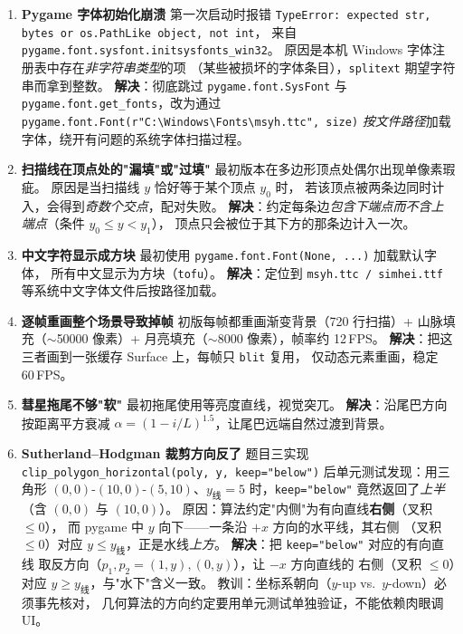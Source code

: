 \documentclass[12pt, a4paper]{article}
\begin{document}
\begin{enumerate}[label=（\arabic*）, leftmargin=*]
    \item \textbf{Pygame 字体初始化崩溃}\quad
    第一次启动时报错
    \texttt{TypeError: expected str, bytes or os.PathLike object, not int}，
    来自 \texttt{pygame.font.sysfont.initsysfonts\_win32}。
    原因是本机 Windows 字体注册表中存在\textit{非字符串类型}的项
    （某些被损坏的字体条目），\texttt{splitext} 期望字符串而拿到整数。
    \textbf{解决}：彻底跳过 \texttt{pygame.font.SysFont} 与
    \texttt{pygame.font.get\_fonts}，改为通过
    \texttt{pygame.font.Font(r"C:\textbackslash{}Windows\textbackslash{}Fonts\textbackslash{}msyh.ttc", size)}
    \textit{按文件路径}加载字体，绕开有问题的系统字体扫描过程。

    \item \textbf{扫描线在顶点处的"漏填"或"过填"}\quad
    最初版本在多边形顶点处偶尔出现单像素瑕疵。
    原因是当扫描线 $y$ 恰好等于某个顶点 $y_0$ 时，
    若该顶点被两条边同时计入，会得到\textit{奇数个交点}，配对失败。
    \textbf{解决}：约定每条边\textit{包含下端点而不含上端点}（条件 $y_0 \le y < y_1$），
    顶点只会被位于其下方的那条边计入一次。

    \item \textbf{中文字符显示成方块}\quad
    最初使用 \texttt{pygame.font.Font(None, ...)} 加载默认字体，
    所有中文显示为方块（\texttt{tofu}）。
    \textbf{解决}：定位到 \texttt{msyh.ttc / simhei.ttf} 等系统中文字体文件后按路径加载。

    \item \textbf{逐帧重画整个场景导致掉帧}\quad
    初版每帧都重画渐变背景（720 行扫描）+ 山脉填充（$\sim$50000 像素）+
    月亮填充（$\sim$8000 像素），帧率约 12\,FPS。
    \textbf{解决}：把这三者画到一张缓存 Surface 上，每帧只 \texttt{blit} 复用，
    仅动态元素重画，稳定 60\,FPS。

    \item \textbf{彗星拖尾不够"软"}\quad
    最初拖尾使用等亮度直线，视觉突兀。
    \textbf{解决}：沿尾巴方向按距离平方衰减
    $\alpha = (1 - i/L)^{1.5}$，让尾巴远端自然过渡到背景。

    \item \textbf{Sutherland--Hodgman 裁剪方向反了}\quad
    题目三实现 \texttt{clip\_polygon\_horizontal(poly, y, keep="below")}
    后单元测试发现：用三角形 $(0,0)\text{-}(10,0)\text{-}(5,10)$、$y_{\text{线}}=5$
    时，\texttt{keep="below"} 竟然返回了\textit{上半}（含 $(0,0)$ 与 $(10,0)$）。
    原因：算法约定"内侧"为有向直线\textbf{右侧}（叉积 $\le 0$），
    而 pygame 中 $y$ 向下——一条沿 $+x$ 方向的水平线，其右侧
    （叉积 $\le 0$）对应 $y \le y_{\text{线}}$，正是水线\textit{上方}。
    \textbf{解决}：把 \texttt{keep="below"} 对应的有向直线
    取反方向（$p_1, p_2 = (1, y), (0, y)$），让 $-x$ 方向直线的
    右侧（叉积 $\le 0$）对应 $y \ge y_{\text{线}}$，与"水下"含义一致。
    教训：坐标系朝向（$y$-up vs.\ $y$-down）必须事先核对，
    几何算法的方向约定要用单元测试单独验证，不能依赖肉眼调 UI。


\end{enumerate}
\end{document}
